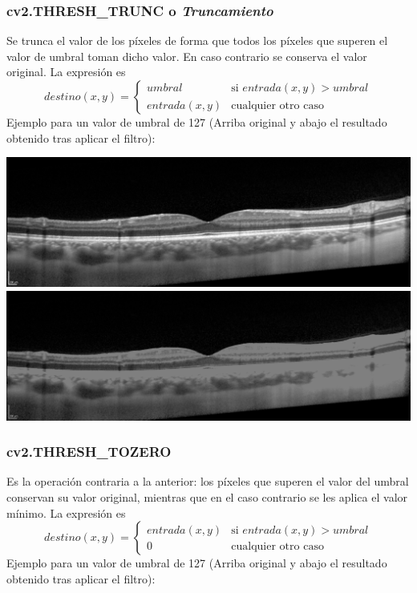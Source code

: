 \subsubsection{cv2.THRESH\_TRUNC o \emph{Truncamiento}}
Se trunca el valor de los píxeles de forma que todos los píxeles que
superen el valor de umbral toman dicho valor. En caso contrario se
conserva el valor original. La expresión es
\begin{equation*}
  destino(x, y) =
  \begin{cases}
    umbral & \text{si } entrada(x, y) > umbral \\
    entrada(x, y) & \text{cualquier otro caso}
  \end{cases}
\end{equation*}
Ejemplo para un valor de umbral de 127 (Arriba original y abajo el
resultado obtenido tras aplicar el filtro):

\includegraphics[scale=0.40]{imagenes/EjemploTecnicasThresholdOriginal.png}\\
\includegraphics[scale=0.40]{imagenes/EjemploTecnicasThresholdTrunc_127.png}


\subsubsection{cv2.THRESH\_TOZERO}
Es la operación contraria a la anterior: los píxeles que superen el
valor del umbral conservan su valor original, mientras que en el caso
contrario se les aplica el valor mínimo. La expresión es
\begin{equation*}
  destino(x, y) =
  \begin{cases}
    entrada(x, y) & \text{si } entrada(x, y) > umbral \\
    0 & \text{cualquier otro caso}
  \end{cases}
\end{equation*}
Ejemplo para un valor de umbral de 127 (Arriba original y abajo el
resultado obtenido tras aplicar el filtro):

